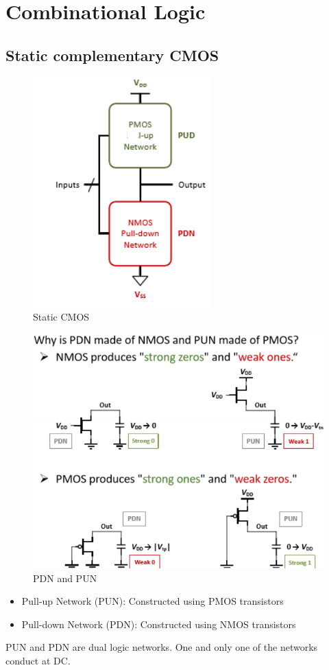 \section{Combinational Logic}

\subsection{Static complementary CMOS}

\begin{figure}
    \centering
    \includegraphics[scale=1.0]{images/static_CMOS.png}
    \caption{Static CMOS}
\end{figure}

\begin{figure}
    \centering
    \includegraphics[scale=0.7]{images/PDN_PUN_NMOS_PMOS.png}
    \caption{PDN and PUN}
\end{figure}

\begin{itemize}
    \item Pull-up Network (PUN): Constructed using PMOS transistors
    \item Pull-down Network (PDN): Constructed using NMOS transistors
\end{itemize}

PUN and PDN are dual logic networks. One and only one of the networks conduct at DC. 